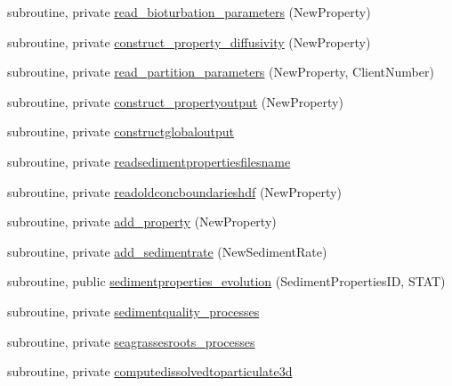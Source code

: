 \begin{DoxyCompactItemize}
\item 
subroutine, private \mbox{\hyperlink{namespacemodulesedimentproperties_aa74dbe9c3eb52147100981fe4f5d8702}{read\+\_\+bioturbation\+\_\+parameters}} (New\+Property)
\item 
subroutine, private \mbox{\hyperlink{namespacemodulesedimentproperties_ad39d979b59e5b787373491b93c07fbf0}{construct\+\_\+property\+\_\+diffusivity}} (New\+Property)
\item 
subroutine, private \mbox{\hyperlink{namespacemodulesedimentproperties_afa4c90b28af961558ea18ba6ed05123b}{read\+\_\+partition\+\_\+parameters}} (New\+Property, Client\+Number)
\item 
subroutine, private \mbox{\hyperlink{namespacemodulesedimentproperties_ae799f87453bb5cd4088f0289710bf961}{construct\+\_\+propertyoutput}} (New\+Property)
\item 
subroutine, private \mbox{\hyperlink{namespacemodulesedimentproperties_a003638c1656ce528c586d7f167d3d025}{constructglobaloutput}}
\item 
subroutine, private \mbox{\hyperlink{namespacemodulesedimentproperties_a75f3289f9063b5325117a4d39bebace2}{readsedimentpropertiesfilesname}}
\item 
subroutine, private \mbox{\hyperlink{namespacemodulesedimentproperties_a5eab479d8cef7089906fb647d918b3fe}{readoldconcboundarieshdf}} (New\+Property)
\item 
subroutine, private \mbox{\hyperlink{namespacemodulesedimentproperties_a6c62c3f418883d0d880c6158695566b6}{add\+\_\+property}} (New\+Property)
\item 
subroutine, private \mbox{\hyperlink{namespacemodulesedimentproperties_a01426b1d7936843c8ff328ebd6feba46}{add\+\_\+sedimentrate}} (New\+Sediment\+Rate)
\item 
subroutine, public \mbox{\hyperlink{namespacemodulesedimentproperties_ac0e9a7cb95c81a6f95797a7750889730}{sedimentproperties\+\_\+evolution}} (Sediment\+Properties\+ID, S\+T\+AT)
\item 
subroutine, private \mbox{\hyperlink{namespacemodulesedimentproperties_a226feff76b7adff9c39d5d0b84ea662e}{sedimentquality\+\_\+processes}}
\item 
subroutine, private \mbox{\hyperlink{namespacemodulesedimentproperties_abe11ce25dab5cf7abc26eeb1fb7fdcd9}{seagrassesroots\+\_\+processes}}
\item 
subroutine, private \mbox{\hyperlink{namespacemodulesedimentproperties_ad4fd225155211238920de3285f222390}{computedissolvedtoparticulate3d}}
\item 

\end{DoxyCompactItemize}
